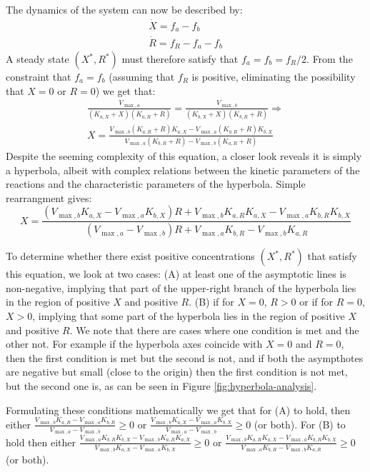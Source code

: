 \documentclass[a4page,notitlepage]{article}
\begin{document}
    The dynamics of the system can now be described by:
    \begin{eqnarray*}
        \dot X = f_a-f_b \\
        \dot R = f_R-f_a-f_b
    \end{eqnarray*}
    A steady state $(X^*,R^*)$ must therefore satisfy that $f_a=f_b=f_R/2$.
    From the constraint that $f_a=f_b$ (assuming that $f_R$ is positive, eliminating the possibility that $X=0$ or $R=0$) we get that:
    \begin{eqnarray*}
        \frac{V_{\max,a}}{(K_{a,X}+X)(K_{a,R}+R)}=\frac{V_{\max,b}}{(K_{b,X}+X)(K_{b,R}+R)} \Rightarrow \\
        X=\frac{V_{\max,b}(K_{a,R}+R)K_{a,X}-V_{\max,a}(K_{b,R}+R)K_{b,X}}{V_{\max,a}(K_{b,R}+R)-V_{\max,b}(K_{a,R}+R)}
    \end{eqnarray*}
    Despite the seeming complexity of this equation, a closer look reveals it is simply a hyperbola, albeit with complex relations between the kinetic parameters of the reactions and the characteristic parameters of the hyperbola.
    Simple rearrangment gives:
    \begin{equation*}
        X=\frac{(V_{\max,b}K_{a,X}-V_{\max,a}K_{b,X})R+V_{\max,b}K_{a,R}K_{a,X}-V_{\max,a}K_{b,R}K_{b,X}}{(V_{\max,a}-V_{\max,b})R+V_{\max,a}K_{b,R}-V_{\max,b}K_{a,R}}
    \end{equation*}

    To determine whether there exist positive concentrations $(X^*,R^*)$ that satisfy this equation, we look at two cases:
    (A) at least one of the asymptotic lines is non-negative, implying that part of the upper-right branch of the hyperbola lies in the region of positive $X$ and positive $R$.
    (B) if for $X=0$, $R>0$ or if for $R=0$, $X>0$, implying that some part of the hyperbola lies in the region of positive $X$ and positive $R$.
    We note that there are cases where one condition is met and the other not.
    For example if the hyperbola axes coincide with $X=0$ and $R=0$, then the first condition is met but the second is not, and if both the asympthotes are negative but small (close to the origin) then the first condition is not met, but the second one is, as can be seen in Figure \ref{fig:hyperbola-analysis}.

    Formulating these conditions mathematically we get that for (A) to hold, then either $\frac{V_{\max,b}K_{a,R}-V_{\max,a}K_{b,R}}{V_{\max,a}-V_{\max,b}}\geq 0$ or $\frac{V_{\max,b}K_{a,X}-V_{\max,a}K_{b,X}}{V_{\max,a}-V_{\max,b}}\geq 0$ (or both).
    For (B) to hold then either $\frac{V_{\max,a}K_{b,R}K_{b,X}-V_{\max,b}K_{a,R}K_{a,X}}{V_{\max,b}K_{a,X}-V_{\max,a}K_{b,X}}\geq 0$ or $\frac{V_{\max,b}K_{a,R}K_{a,X}-V_{\max,a}K_{b,R}K_{b,X}}{V_{\max,a}K_{b,R}-V_{\max,b}K_{a,R}} \geq 0$ (or both).
\end{document}
